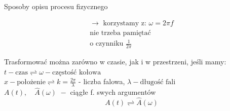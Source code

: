 \begin{frame}[allowframebreaks]{Sposoby opisu procesu fizycznego}
\begin{block}
\[\begin{array}{r}
		\rightarrow \,\, \text{korzystamy z: } \omega = 2 \pi f\\
		\text{nie trzeba pamiętać}\\ \text{o czynniku } \frac{1}{2 \pi}
	\end{array}
	\]
	\end{block}
	Trasformować można zarówno w czasie, jak i w przestrzeni,	jeśli mamy:\\
	$t - \text{czas} \rightleftharpoons \omega - \text{częstość kołowa}$
	\\ $x - \text{położenie} \rightleftharpoons k=\frac{2\pi}{\lambda}$ - liczba falowa,
	$ \lambda - \text{długość fali}$
	\\ $A(t), \quad \widehat{A}(\omega) \,\, - $ ciągłe f. swych argumentów
	\[
		A(t) \rightleftharpoons \widehat{A}(\omega) %
	\]
\end{frame}
